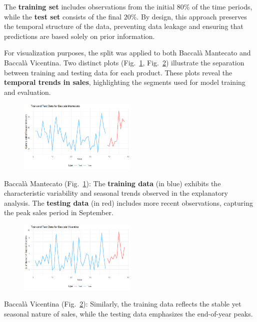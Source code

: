 \documentclass[10pt,twocolumn,letterpaper]{article}
\begin{document}
The \textbf{training set} includes observations from the initial $80$\% of the time periods, while the \textbf{test set} consists of the final $20$\%. By design, this approach preserves the temporal structure of the data, preventing data leakage and ensuring that predictions are based solely on prior information.

For visualization purposes, the split was applied to both Baccalà Mantecato and Baccalà Vicentina. Two distinct plots (Fig.~\ref{fig:TRAIN_TEST_MAN}, Fig.~\ref{fig:TRAIN_TEST_VIC}) illustrate the separation between training and testing data for each product. These plots reveal the \textbf{temporal trends in sales}, highlighting the segments used for model training and evaluation.
\begin{figure}[h!]
    \centering
    \includegraphics[width=0.5\textwidth]{PlotsBEFD/TRAIN_TEST_MAN.png} 
    \caption{}
    \label{fig:TRAIN_TEST_MAN}
\end{figure}
Baccalà Mantecato (Fig.~\ref{fig:TRAIN_TEST_MAN}): The \textbf{training data} (in blue) exhibits the characteristic variability and seasonal trends observed in the explanatory analysis. The \textbf{testing data} (in red) includes more recent observations, capturing the peak sales period in September.
\begin{figure}[H]
    \centering
    \includegraphics[width=0.5\textwidth]{PlotsBEFD/TRAIN_TEST_VIC.png} 
    \caption{}
    \label{fig:TRAIN_TEST_VIC}
\end{figure}
Baccalà Vicentina (Fig.~\ref{fig:TRAIN_TEST_VIC}): Similarly, the training data reflects the stable yet seasonal nature of sales, while the testing data emphasizes the end-of-year peaks.
\end{document}
